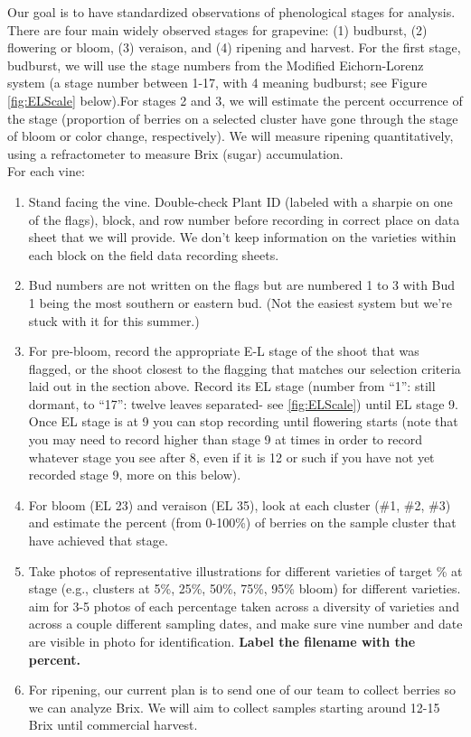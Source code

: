 \documentclass[11pt,letter]{article}
\begin{document}
Our goal is to have standardized observations of phenological stages for analysis. There are four main widely observed stages for grapevine: (1) budburst, (2) flowering or bloom, (3) veraison, and (4) ripening and harvest. For the first stage, budburst, we will use the stage numbers from the Modified Eichorn-Lorenz system (a stage number between 1-17, with 4 meaning budburst; see Figure \ref{fig:ELScale} below).For stages 2 and 3, we will estimate the percent occurrence of the stage (proportion of berries on a selected cluster have gone through the stage of bloom or color change, respectively). We will measure ripening quantitatively, using a refractometer to measure Brix (sugar) accumulation. \\

For each vine:
\begin{enumerate}
	\item Stand facing the vine. Double-check Plant ID (labeled with a sharpie on one of the flags), block, and row number before recording in correct place on data sheet that we will provide. We don't keep information on the varieties within each block on the field data recording sheets.
	\item Bud numbers are not written on the flags but are numbered 1 to 3 with Bud 1 being the most southern or eastern bud. (Not the easiest system but we're stuck with it for this summer.)
	\item For pre-bloom, record the appropriate E-L stage of the shoot that was flagged, or the shoot closest to the flagging that matches our selection criteria laid out in the section above. Record its EL stage (number from “1”: still dormant, to “17”: twelve leaves separated- see \ref{fig:ELScale}) until EL stage 9. Once EL stage is at 9 you can stop recording until flowering starts (note that you may need to record higher than stage 9 at times in order to record whatever stage you see after 8, even if it is 12 or such if you have not yet recorded stage 9, more on this below).
	\item  For bloom (EL 23) and veraison (EL 35), look at each cluster (\#1, \#2, \#3) and estimate the percent (from 0-100\%) of berries on the sample cluster that have achieved that stage. 
	\item Take photos of representative illustrations for different varieties of target \% at stage (e.g., clusters at 5\%, 25\%, 50\%, 75\%, 95\% bloom) for different varieties. aim for 3-5 photos of each percentage taken across a diversity of varieties and across a couple different sampling dates, and make sure vine number and date are visible in photo for identification. {\bf Label the filename with the percent.}
	\item For ripening, our current plan is to send one of our team to collect berries so we can analyze Brix. We will aim to collect samples starting around 12-15 Brix until commercial harvest. %

\end{enumerate}
\end{document}
